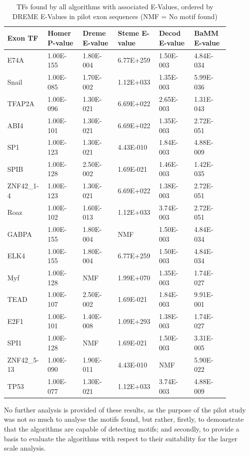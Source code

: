 \documentclass[12pt]{article}
\begin{document}
\begin{table}[!ht]
\centering
\caption{TFs found by all algorithms with associated E-Values, ordered by DREME E-Values in pilot exon sequences (NMF = No motif found)}\label{motif_evalue_summary_exons}
\begin{tabular}{p{0.15\linewidth}p{0.15\linewidth}p{0.15\linewidth}p{0.15\linewidth}p{0.15\linewidth}p{0.15\linewidth}}
\toprule[0.2em]
Exon TF & Homer P-value & Dreme E-value & Steme E-value & Decod E-value & BaMM E-value\\ 
\midrule[0.1em]
E74A&1.00E-155&1.80E-004&6.77E+259&1.50E-003&4.84E-034\\
Snail&1.00E-085&1.70E-002&1.12E+033&1.35E-003&5.99E-036\\
TFAP2A&1.00E-096&1.30E-021&6.69E+022&2.65E-003&1.31E-043\\
ABI4&1.00E-101&1.30E-021&6.69E+022&1.35E-003&2.72E-051\\
SP1&1.00E-123&1.30E-021&4.43E-010&1.84E-003&4.88E-009\\
SPIB&1.00E-128&2.50E-002&1.69E-021&1.46E-003&1.42E-035\\
ZNF42{\_}1-4&1.00E-123&1.30E-021&6.69E+022&1.38E-003&2.72E-051\\
Roaz&1.00E-102&1.60E-013&1.12E+033&3.74E-003&2.72E-051\\
GABPA&1.00E-155&1.80E-004&NMF&1.50E-003&4.84E-034\\
ELK4&1.00E-155&1.80E-004&6.77E+259&1.50E-003&4.84E-034\\
Myf&1.00E-128&NMF&1.99E+070&1.35E-003&1.74E-027\\
TEAD&1.00E-107&2.50E-002&1.69E-021&1.84E-003&9.91E-001\\
E2F1&1.00E-101&1.40E-008&1.09E+293&1.38E-003&1.74E-027\\
SPI1&1.00E-128&NMF&1.69E-021&1.50E-003&3.31E-005\\
ZNF42{\_}5-13&1.00E-090&1.90E-011&4.43E-010&NMF&5.90E-022\\
TP53&1.00E-077&1.30E-021&1.12E+033&3.74E-003&4.88E-009\\
\bottomrule[0.2em]
\end{tabular}
\end{table}

No further analysis is provided of these results, as the purpose of the pilot study was not so much to analyse the motifs found, but rather, firstly, to demonstrate that the algorithms are capable of detecting motifs; and secondly, to provide a basis to evaluate the algorithms with respect to their suitability for the larger scale analysis.
\end{document}
